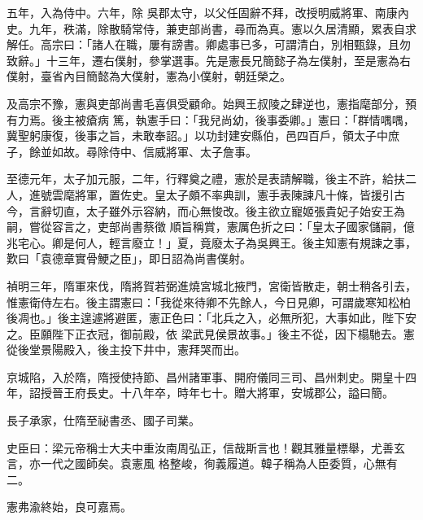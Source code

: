 \begin{pinyinscope}
 五年，入為侍中。六年，除
 吳郡太守，以父任固辭不拜，改授明威將軍、南康內史。九年，秩滿，除散騎常侍，兼吏部尚書，尋而為真。憲以久居清顯，累表自求解任。高宗曰：「諸人在職，屢有謗書。卿處事已多，可謂清白，別相甄錄，且勿致辭。」十三年，遷右僕射，參掌選事。先是憲長兄簡懿子為左僕射，至是憲為右僕射，臺省內目簡懿為大僕射，憲為小僕射，朝廷榮之。



 及高宗不豫，憲與吏部尚書毛喜俱受顧命。始興王叔陵之肆逆也，憲指麾部分，預有力焉。後主被瘡病
 篤，執憲手曰：「我兒尚幼，後事委卿。」憲曰：「群情喁喁，冀聖躬康復，後事之旨，未敢奉詔。」以功封建安縣伯，邑四百戶，領太子中庶子，餘並如故。尋除侍中、信威將軍、太子詹事。



 至德元年，太子加元服，二年，行釋奠之禮，憲於是表請解職，後主不許，給扶二人，進號雲麾將軍，置佐史。皇太子頗不率典訓，憲手表陳諫凡十條，皆援引古今，言辭切直，太子雖外示容納，而心無悛改。後主欲立寵姬張貴妃子始安王為嗣，嘗從容言之，吏部尚書蔡徵
 順旨稱賞，憲厲色折之曰：「皇太子國家儲嗣，億兆宅心。卿是何人，輕言廢立！」夏，竟廢太子為吳興王。後主知憲有規諫之事，歎曰「袁德章實骨鯁之臣」，即日詔為尚書僕射。



 禎明三年，隋軍來伐，隋將賀若弼進燒宮城北掖門，宮衛皆散走，朝士稍各引去，惟憲衛侍左右。後主謂憲曰：「我從來待卿不先餘人，今日見卿，可謂歲寒知松柏後凋也。」後主遑遽將避匿，憲正色曰：「北兵之入，必無所犯，大事如此，陛下安之。臣願陛下正衣冠，御前殿，依
 梁武見侯景故事。」後主不從，因下榻馳去。憲從後堂景陽殿入，後主投下井中，憲拜哭而出。



 京城陷，入於隋，隋授使持節、昌州諸軍事、開府儀同三司、昌州刺史。開皇十四年，詔授晉王府長史。十八年卒，時年七十。贈大將軍，安城郡公，謚曰簡。



 長子承家，仕隋至祕書丞、國子司業。



 史臣曰：梁元帝稱士大夫中重汝南周弘正，信哉斯言也！觀其雅量標舉，尤善玄言，亦一代之國師矣。袁憲風
 格整峻，徇義履道。韓子稱為人臣委質，心無有二。



 憲弗渝終始，良可嘉焉。



\end{pinyinscope}